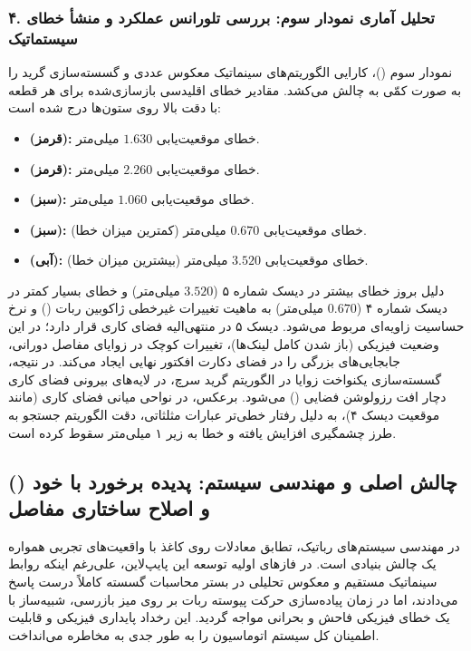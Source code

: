 \documentclass{article}
\begin{document}
\subsubsection*{۴. تحلیل آماری نمودار سوم: بررسی تلورانس عملکرد و منشأ خطای سیستماتیک}

نمودار سوم ()، کارایی الگوریتم‌های سینماتیک معکوس عددی و گسسته‌سازی گرید را به صورت کمّی به چالش می‌کشد. مقادیر خطای اقلیدسی بازسازی‌شده برای هر قطعه با دقت بالا روی ستون‌ها درج شده است:
\begin{itemize}
	\item \textbf{ (قرمز):} خطای موقعیت‌یابی $1.630$ میلی‌متر.
	\item \textbf{ (قرمز):} خطای موقعیت‌یابی $2.260$ میلی‌متر.
	\item \textbf{ (سبز):} خطای موقعیت‌یابی $1.060$ میلی‌متر.
	\item \textbf{ (سبز):} خطای موقعیت‌یابی $0.670$ میلی‌متر (کمترین میزان خطا).
	\item \textbf{ (آبی):} خطای موقعیت‌یابی $3.520$ میلی‌متر (بیشترین میزان خطا).
\end{itemize}


دلیل بروز خطای بیشتر در دیسک شماره ۵ ($3.520$ میلی‌متر) و خطای بسیار کمتر در دیسک شماره ۴ ($0.670$ میلی‌متر) به ماهیت تغییرات غیرخطی ژاکوبین ربات () و نرخ حساسیت زاویه‌ای مربوط می‌شود. دیسک ۵ در منتهی‌الیه فضای کاری قرار دارد؛ در این وضعیت فیزیکی (باز شدن کامل لینک‌ها)، تغییرات کوچک در زوایای مفاصل دورانی، جابجایی‌های بزرگی را در فضای دکارت افکتور نهایی ایجاد می‌کند. در نتیجه، گسسته‌سازی یکنواخت زوایا در الگوریتم گرید سرچ، در لایه‌های بیرونی فضای کاری دچار افت رزولوشن فضایی () می‌شود. برعکس، در نواحی میانی فضای کاری (مانند موقعیت دیسک ۴)، به دلیل رفتار خطی‌تر عبارات مثلثاتی، دقت الگوریتم جستجو به طرز چشمگیری افزایش یافته و خطا به زیر ۱ میلی‌متر سقوط کرده است.


\subsection{چالش اصلی و مهندسی سیستم: پدیده برخورد با خود () و اصلاح ساختاری مفاصل}

در مهندسی سیستم‌های رباتیک، تطابق معادلات روی کاغذ با واقعیت‌های تجربی همواره یک چالش بنیادی است. در فازهای اولیه توسعه این پایپ‌لاین، علی‌رغم اینکه روابط سینماتیک مستقیم و معکوس تحلیلی در بستر محاسبات گسسته کاملاً درست پاسخ می‌دادند، اما در زمان پیاده‌سازی حرکت پیوسته ربات بر روی میز بازرسی، شبیه‌ساز با یک خطای فیزیکی فاحش و بحرانی مواجه گردید. این رخداد پایداری فیزیکی و قابلیت اطمینان کل سیستم اتوماسیون را به طور جدی به مخاطره می‌انداخت. 
\end{document}
